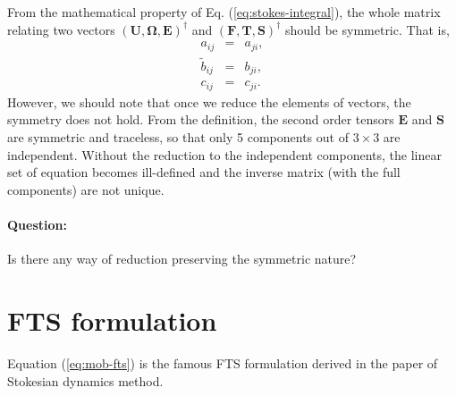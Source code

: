 \documentclass{book}
\begin{document}
From the mathematical property of Eq. (\ref{eq:stokes-integral}),
the whole matrix relating two vectors
$(\bm{U}, \bm{\Omega}, \bm{E})^\dagger$ and
$(\bm{F}, \bm{T}, \bm{S})^\dagger$
should be symmetric.
That is,
\begin{eqnarray}
  a_{ij} &=& a_{ji},\\
  \tilde{b}_{ij} &=& b_{ji},\\
  c_{ij} &=& c_{ji}.
\end{eqnarray}
However, we should note that
once we reduce the elements of vectors,
the symmetry does not hold.
From the definition, the second order tensors $\bm{E}$ and $\bm{S}$
are symmetric and traceless, so that only 5 components
out of $3\times 3$ are independent.
Without the reduction to the independent components,
the linear set of equation becomes ill-defined
and the inverse matrix (with the full components) are not unique.

\paragraph{Question:}
Is there any way of reduction
preserving the symmetric nature?


\section{FTS formulation}
Equation (\ref{eq:mob-fts}) is the famous FTS formulation
derived in the paper of Stokesian dynamics method\cite{durlofsky1987a}.
\end{document}
